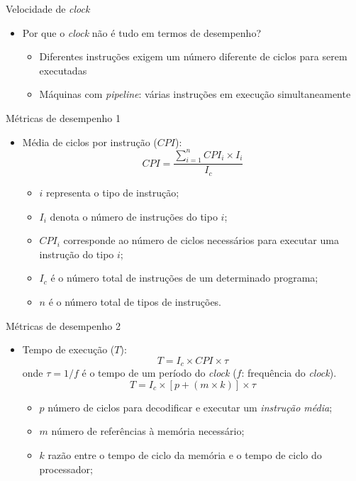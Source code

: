 \begin{slide}{Velocidade de \emph{clock}}
\begin{itemize}
   \item Por que o \emph{clock} não é tudo em termos de desempenho?
   \begin{itemize}
      \item Diferentes instruções exigem um número diferente de ciclos para serem executadas
      \item Máquinas com \textit{pipeline}: várias instruções em execução simultaneamente
   \end{itemize}
\end{itemize}
\end{slide}

\begin{slide}{Métricas de desempenho 1}
\begin{itemize}
   \item Média de ciclos por instrução ($CPI$):
   \begin{equation}
       CPI = \frac{\sum_{i = 1}^{n} CPI_i\times I_i}{I_c}
   \end{equation}
   \begin{itemize}
      \item $i$ representa o tipo de instrução; 
      \item $I_i$ denota o número de instruções do tipo $i$; 
      \item $CPI_i$ corresponde ao número de ciclos necessários para executar uma instrução do tipo $i$; 
      \item $I_c$ é o número total de instruções de um determinado programa; 
      \item $n$ é o número total de tipos de instruções.
   \end{itemize}
\end{itemize}
\end{slide}

\begin{slide}{Métricas de desempenho 2}
\begin{itemize}
   \item Tempo de execução ($T$):
   \begin{equation}
       T = I_c \times CPI\times \tau
   \end{equation}
   onde $\tau = 1/f$ é o tempo de um período do \emph{clock} ($f$: frequência do \emph{clock}).
   \begin{equation}
      T = I_c \times \left [ p + \left ( m\times k \right )\right ]\times \tau
   \end{equation}
   \begin{itemize}
      \item $p$ número de ciclos para decodificar e executar um \emph{instrução média}; 
      \item $m$ número de referências à memória necessário; 
      \item $k$ razão entre o tempo de ciclo da memória e o tempo de ciclo do processador; 
   \end{itemize}
\end{itemize}
\end{slide}

